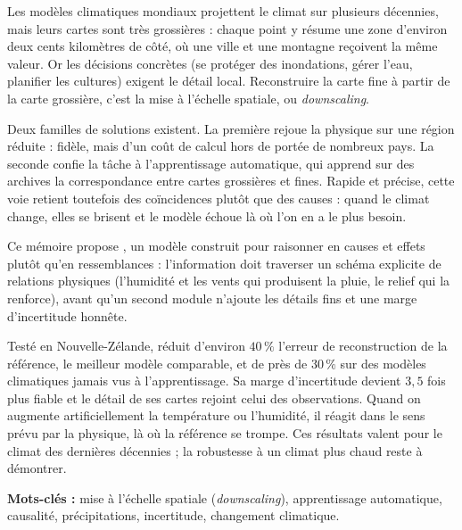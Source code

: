\let\oldprintchaptertitle=\printchaptertitle
\renewcommand{\printchaptertitle}[1]{%
	\vspace*{-75pt}
	\oldprintchaptertitle{#1}
}%
\let\printchaptertitle=\oldprintchaptertitle

Les modèles climatiques mondiaux projettent le climat sur plusieurs décennies, mais leurs cartes sont très grossières : chaque point y résume une zone d'environ deux cents kilomètres de côté, où une ville et une montagne reçoivent la même valeur. Or les décisions concrètes (se protéger des inondations, gérer l'eau, planifier les cultures) exigent le détail local. Reconstruire la carte fine à partir de la carte grossière, c'est la mise à l'échelle spatiale, ou \emph{downscaling}.

Deux familles de solutions existent. La première rejoue la physique sur une région réduite : fidèle, mais d'un coût de calcul hors de portée de nombreux pays. La seconde confie la tâche à l'apprentissage automatique, qui apprend sur des archives la correspondance entre cartes grossières et fines. Rapide et précise, cette voie retient toutefois des coïncidences plutôt que des causes : quand le climat change, elles se brisent et le modèle échoue là où l'on en a le plus besoin.

Ce mémoire propose \Oracle{}, un modèle construit pour raisonner en causes et effets plutôt qu'en ressemblances : l'information doit traverser un schéma explicite de relations physiques (l'humidité et les vents qui produisent la pluie, le relief qui la renforce), avant qu'un second module n'ajoute les détails fins et une marge d'incertitude honnête.

Testé en Nouvelle-Zélande, \Oracle{} réduit d'environ $40\,\%$ l'erreur de reconstruction de la référence, le meilleur modèle comparable, et de près de $30\,\%$ sur des modèles climatiques jamais vus à l'apprentissage. Sa marge d'incertitude devient $3{,}5$ fois plus fiable et le détail de ses cartes rejoint celui des observations. Quand on augmente artificiellement la température ou l'humidité, il réagit dans le sens prévu par la physique, là où la référence se trompe. Ces résultats valent pour le climat des dernières décennies ; la robustesse à un climat plus chaud reste à démontrer.

\vspace{0.3em}
\noindent\textbf{Mots-clés :} mise à l'échelle spatiale (\emph{downscaling}), apprentissage automatique, causalité, précipitations, incertitude, changement climatique.

\myCleanStarChapterEnd
